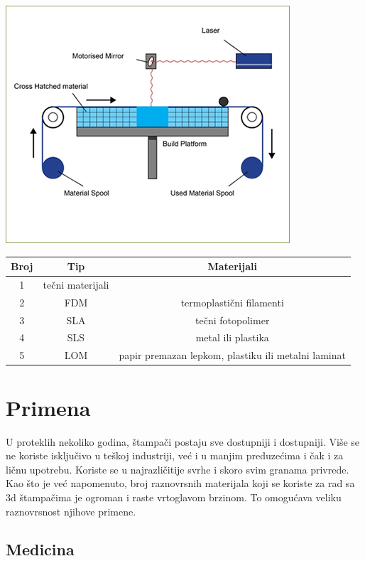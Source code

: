 \documentclass[a4paper]{article}
\begin{document}
\begin{center}
\includegraphics[width=.5\textwidth ]{Tehnikeslike/LOM.jpg}
\end{center}

\begin{center}
\begin{tabular}{||c c c ||} 
 \hline
 Broj & Tip  & Materijali \\ [1ex] 
 \hline\hline
 1 & tečni materijali  &\\ 
 \hline
 2 & FDM & termoplastični filamenti \\
 \hline
 3 & SLA & tečni fotopolimer\\
 \hline
 4 & SLS & metal ili plastika\\
 \hline
 5 & LOM & papir premazan lepkom, plastiku ili metalni laminat\\ [1ex] 
 \hline
\end{tabular}
\end{center}

\newpage

\section{Primena\cite{a}}
\label{sec:Primena}

U proteklih nekoliko godina, štampači postaju sve dostupniji i dostupniji. Više se ne koriste isključivo u teškoj industriji, već i u manjim preduzećima i čak i za ličnu upotrebu. Koriste se u najrazličitije svrhe i skoro svim granama privrede. Kao što je već napomenuto, broj raznovrsnih materijala koji se koriste za rad sa 3d štampačima je ogroman i raste vrtoglavom brzinom. To omogućava veliku raznovrsnost njihove primene. 

\subsection{Medicina}
\label{subsec:podnaslov6}
\end{document}
